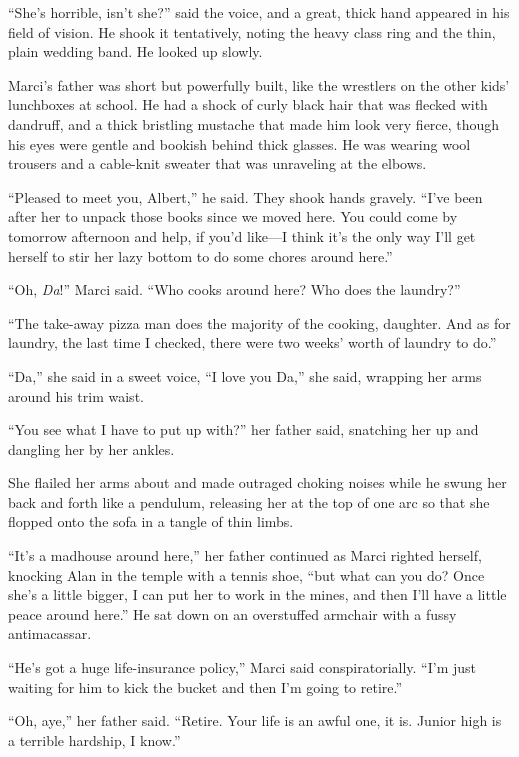 \documentclass{article}
\begin{document}
``She's horrible, isn't she?'' said the voice, and a great, thick hand
appeared in his field of vision.  He shook it tentatively, noting the
heavy class ring and the thin, plain wedding band.  He looked up
slowly.

Marci's father was short but powerfully built, like the wrestlers on
the other kids' lunchboxes at school.  He had a shock of curly black
hair that was flecked with dandruff, and a thick bristling mustache
that made him look very fierce, though his eyes were gentle and
bookish behind thick glasses.  He was wearing wool trousers and a
cable-knit sweater that was unraveling at the elbows.

``Pleased to meet you, Albert,'' he said.  They shook hands gravely. 
``I've been after her to unpack those books since we moved here.  You
could come by tomorrow afternoon and help, if you'd like---I think
it's the only way I'll get herself to stir her lazy bottom to do some
chores around here.''

``Oh, \textit{Da}!'' Marci said.  ``Who cooks around here?  Who does
the laundry?''

``The take-away pizza man does the majority of the cooking, daughter. 
And as for laundry, the last time I checked, there were two weeks'
worth of laundry to do.''

``Da,'' she said in a sweet voice, ``I love you Da,'' she said,
wrapping her arms around his trim waist.

``You see what I have to put up with?'' her father said, snatching her
up and dangling her by her ankles.

She flailed her arms about and made outraged choking noises while he
swung her back and forth like a pendulum, releasing her at the top of
one arc so that she flopped onto the sofa in a tangle of thin limbs.

``It's a madhouse around here,'' her father continued as Marci righted
herself, knocking Alan in the temple with a tennis shoe, ``but what
can you do?  Once she's a little bigger, I can put her to work in the
mines, and then I'll have a little peace around here.'' He sat down on
an overstuffed armchair with a fussy antimacassar.

``He's got a huge life-insurance policy,'' Marci said
conspiratorially.  ``I'm just waiting for him to kick the bucket and
then I'm going to retire.''

``Oh, aye,'' her father said.  ``Retire.  Your life is an awful one,
it is.  Junior high is a terrible hardship, I know.''
\end{document}
